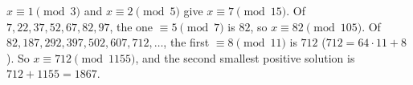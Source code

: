 $x\equiv1\pmod3$ and $x\equiv2\pmod5$ give $x\equiv7\pmod{15}$. Of $7,22,37,52,67,82,97$, the one $\equiv5\pmod7$ is $82$, so $x\equiv82\pmod{105}$. Of $82,187,292,397,502,607,712,\dots$, the first $\equiv8\pmod{11}$ is $712$ ($712=64\cdot11+8$). So $x\equiv712\pmod{1155}$, and the second smallest positive solution is $712+1155=\boxed{1867}$.
